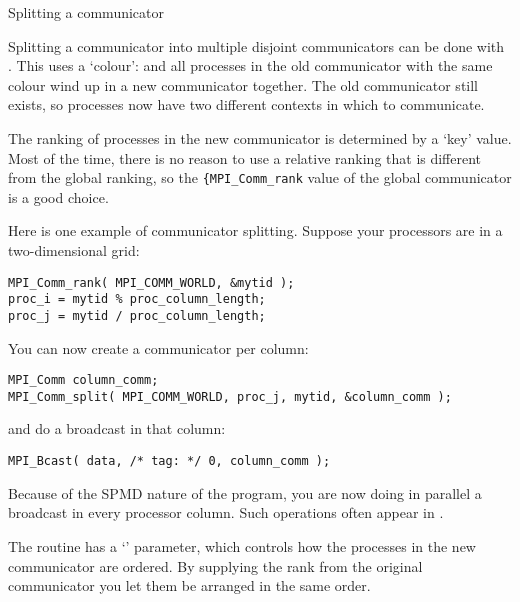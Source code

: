 
 {Splitting a communicator}
\label{sec:comm-split}

Splitting a communicator into multiple disjoint communicators
can be done with .
This uses a `colour':
%
%
and all processes in the old communicator with the same colour
wind up in a new communicator together. The old communicator still exists,
so processes now have two different contexts in which to communicate.

The ranking of processes in the new communicator is determined by a `key' value.
Most of the time, there is no reason to use a relative ranking that is different from
the global ranking, so the \lstinline${MPI_Comm_rank$ value of the global communicator
is a good choice.

Here is one example of communicator splitting. Suppose your processors
are in a two-dimensional grid:
\begin{lstlisting}
MPI_Comm_rank( MPI_COMM_WORLD, &mytid );
proc_i = mytid % proc_column_length;
proc_j = mytid / proc_column_length;
\end{lstlisting}
You can now create a communicator per column:
\begin{lstlisting}
MPI_Comm column_comm;
MPI_Comm_split( MPI_COMM_WORLD, proc_j, mytid, &column_comm );
\end{lstlisting}
and do a broadcast in that column:
\begin{lstlisting}
MPI_Bcast( data, /* tag: */ 0, column_comm );
\end{lstlisting}
Because of the SPMD nature of the program, you are now doing in parallel
a broadcast in every processor column. Such operations often appear
in .

The  routine has a `' parameter,
which controls how the processes in the new communicator are
ordered. By supplying the rank from the original communicator you let
them be arranged in the same order.

